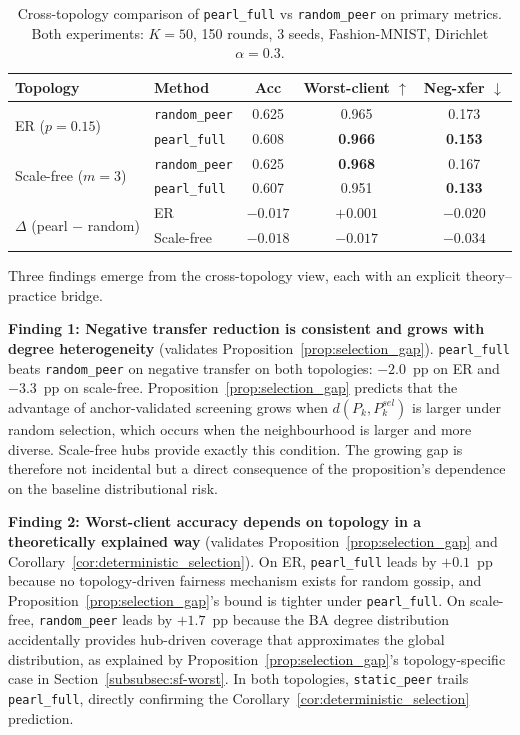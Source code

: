 \documentclass[conference]{IEEEtran}
\begin{document}
\begin{table}[t]
\centering
\caption{Cross-topology comparison of \texttt{pearl\_full} vs \texttt{random\_peer} on primary metrics. Both experiments: $K=50$, 150 rounds, 3 seeds, Fashion-MNIST, Dirichlet $\alpha=0.3$.}
\label{tab:cross_topology}
\renewcommand{\arraystretch}{1.15}
\setlength{\tabcolsep}{4pt}
\begin{tabular}{llccc}
\toprule
\textbf{Topology} & \textbf{Method} & \textbf{Acc} & \textbf{Worst-client} $\uparrow$ & \textbf{Neg-xfer} $\downarrow$ \\
\midrule
\multirow{2}{*}{ER ($p{=}0.15$)}
  & \texttt{random\_peer} & 0.625 & 0.965 & 0.173 \\
  & \texttt{pearl\_full}  & 0.608 & \textbf{0.966} & \textbf{0.153} \\
\midrule
\multirow{2}{*}{Scale-free ($m{=}3$)}
  & \texttt{random\_peer} & 0.625 & \textbf{0.968} & 0.167 \\
  & \texttt{pearl\_full}  & 0.607 & 0.951 & \textbf{0.133} \\
\midrule
\multirow{2}{*}{$\Delta$ (pearl $-$ random)}
  & ER         & $-0.017$ & $+0.001$ & $\mathbf{-0.020}$ \\
  & Scale-free & $-0.018$ & $-0.017$ & $\mathbf{-0.034}$ \\
\bottomrule
\end{tabular}
\end{table}

Three findings emerge from the cross-topology view, each with an explicit theory--practice bridge.

\textbf{Finding 1: Negative transfer reduction is consistent and grows with degree heterogeneity} (validates Proposition~\ref{prop:selection_gap}). \texttt{pearl\_full} beats \texttt{random\_peer} on negative transfer on both topologies: $-2.0$~pp on ER and $-3.3$~pp on scale-free. Proposition~\ref{prop:selection_gap} predicts that the advantage of anchor-validated screening grows when $d(P_k, P^{sel}_k)$ is larger under random selection, which occurs when the neighbourhood is larger and more diverse. Scale-free hubs provide exactly this condition. The growing gap is therefore not incidental but a direct consequence of the proposition's dependence on the baseline distributional risk.

\textbf{Finding 2: Worst-client accuracy depends on topology in a theoretically explained way} (validates Proposition~\ref{prop:selection_gap} and Corollary~\ref{cor:deterministic_selection}). On ER, \texttt{pearl\_full} leads by $+0.1$~pp because no topology-driven fairness mechanism exists for random gossip, and Proposition~\ref{prop:selection_gap}'s bound is tighter under \texttt{pearl\_full}. On scale-free, \texttt{random\_peer} leads by $+1.7$~pp because the BA degree distribution accidentally provides hub-driven coverage that approximates the global distribution, as explained by Proposition~\ref{prop:selection_gap}'s topology-specific case in Section~\ref{subsubsec:sf-worst}. In both topologies, \texttt{static\_peer} trails \texttt{pearl\_full}, directly confirming the Corollary~\ref{cor:deterministic_selection} prediction.
\end{document}
